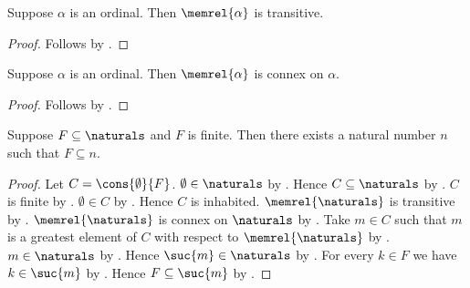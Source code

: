 \begin{proposition}\label{ordinal_membership_relation_transitive}
    Suppose $\alpha$ is an ordinal.
    Then $\memrel{\alpha}$ is transitive.
\end{proposition}
\begin{proof}
    Follows by .
\end{proof}

\begin{proposition}\label{ordinal_membership_relation_connex}
    Suppose $\alpha$ is an ordinal.
    Then $\memrel{\alpha}$ is connex on $\alpha$.
\end{proposition}
\begin{proof}
    Follows by .
\end{proof}

\begin{theorem}\label{finite_subset_of_naturals_bounded}
    Suppose $F\subseteq\naturals$ and $F$ is finite.
    Then there exists a natural number $n$ such that $F\subseteq n$.
\end{theorem}
\begin{proof}
    Let $C=\cons{\emptyset}{F}$.
    $\emptyset\in\naturals$ by .
    Hence $C\subseteq\naturals$ by .
    $C$ is finite by .
    $\emptyset\in C$ by .
    Hence $C$ is inhabited.
    $\memrel{\naturals}$ is transitive
        by .
    $\memrel{\naturals}$ is connex on $\naturals$
        by .
    Take $m\in C$ such that
        $m$ is a greatest element of $C$ with respect to
            $\memrel{\naturals}$
        by .
    $m\in\naturals$ by .
    Hence $\suc{m}\in\naturals$ by .
    For every $k\in F$ we have $k\in\suc{m}$
        by
        .
    Hence $F\subseteq\suc{m}$ by .
\end{proof}


